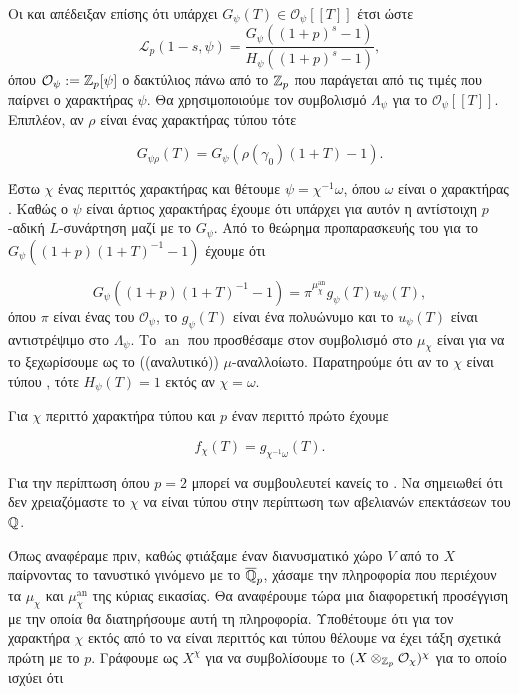 \noindent Οι  και  \cite{DR} απέδειξαν επίσης ότι υπάρχει $G_\psi(T) \in \mathcal{O}_\psi[[T]]$ έτσι ώστε
$$\mathcal{L}_p (1-s,\psi) =\frac{ G_\psi ((1+p)^s -1)}{H_\psi((1+p)^s -1)},$$ όπου $\mathcal{O}_\psi :=\mathbb{Z}_p[\psi]$ ο δακτύλιος πάνω από το $\mathbb{Z}_p$ που παράγεται από τις τιμές που παίρνει ο χαρακτήρας $\psi$. Θα χρησιμοποιούμε τον συμβολισμό $\Lambda_\psi$ για το $\mathcal{O}_\psi[[T]]$. Επιπλέον, αν $\rho$ είναι ένας χαρακτήρας τύπου  τότε 

$$G_{\psi \rho}(T) = G_\psi(\rho(\gamma_0)(1+T)-1).$$

\noindent Έστω $\chi$ ένας περιττός χαρακτήρας και θέτουμε $\psi = \chi^{-1}\omega$, όπου $\omega$ είναι ο χαρακτήρας . Καθώς ο $\psi$ είναι άρτιος χαρακτήρας έχουμε ότι υπάρχει για αυτόν η αντίστοιχη $p$-αδική $L$-συνάρτηση μαζί με το $G_\psi$. Από το θεώρημα προπαρασκευής του  για το $G_\psi((1+p)(1+T)^{-1}-1)$ έχουμε ότι 

$$G_\psi((1+p)(1+T)^{-1}-1) =  \pi^{\mu^{\operatorname{an}}_\chi} g_\psi(T)u_\psi(T),$$ όπου $\pi$ είναι ένας  του $\mathcal{O}_\psi$, το $g_\psi(T)$ είναι ένα  πολυώνυμο και το $u_\psi(T)$ είναι αντιστρέψιμο στο $\Lambda_\psi$. Το $\operatorname{an}$ που προσθέσαμε στον συμβολισμό στο $\mu_\chi$ είναι για να το ξεχωρίσουμε ως το ((αναλυτικό)) $\mu$-αναλλοίωτο. Παρατηρούμε ότι αν το $\chi$ είναι τύπου , τότε $H_\psi(T)=1$ εκτός αν $\chi = \omega$.

\begin{theorem}\label{conj5.1}
    Για $\chi$ περιττό χαρακτήρα τύπου  και $p$ έναν περιττό πρώτο έχουμε

    $$f_\chi(T) = g_{\chi^{-1}\omega}(T) .$$
\end{theorem}

\noindent Για την περίπτωση όπου $p=2$ μπορεί να συμβουλευτεί κανείς το \cite{Wiles2}. Να σημειωθεί ότι δεν χρειαζόμαστε το $\chi$ να είναι τύπου  στην περίπτωση των αβελιανών επεκτάσεων του $\mathbb{Q}$.

Όπως αναφέραμε πριν, καθώς φτιάξαμε έναν διανυσματικό χώρο $V$ από το $X$ παίρνοντας το τανυστικό γινόμενο με το $\overline{\mathbb{Q}}_p$, 
χάσαμε την πληροφορία που περιέχουν τα $\mu_\chi$ και $\mu^{\operatorname{an}}_\chi$ της κύριας εικασίας. 
Θα αναφέρουμε τώρα μια διαφορετική προσέγγιση με την οποία θα διατηρήσουμε αυτή τη πληροφορία. 
Υποθέτουμε ότι για τον χαρακτήρα $\chi$ εκτός από το να είναι περιττός και τύπου  θέλουμε να έχει τάξη σχετικά πρώτη με 
το $p$. Γράφουμε ως $X^\chi$ για να συμβολίσουμε το $(X\otimes_{\mathbb{Z}_p}\mathcal{O}_\chi)^\chi$ για το οποίο ισχύει ότι

